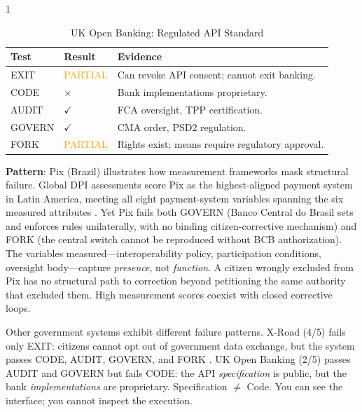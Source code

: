 \documentclass{article}
\begin{document}
\begin{table}[p]
    \begin{subtable}{1\textwidth}
        \centering
        \caption{UK Open Banking: Regulated API Standard}
        \begin{tabular}{@{}llp{7cm}@{}}
            \toprule
            \textbf{Test} & \textbf{Result} & \textbf{Evidence} \\
            \midrule
            EXIT & \textcolor{orange}{PARTIAL} & Can revoke API consent; cannot exit banking. \\
            CODE & $\times$ & Bank implementations proprietary. \\
            AUDIT & $\checkmark$ & FCA oversight, TPP certification. \\
            GOVERN & $\checkmark$ & CMA order, PSD2 regulation. \\
            FORK & \textcolor{orange}{PARTIAL} & Rights exist; means require regulatory approval. \\
            \bottomrule
        \end{tabular}
    \end{subtable}
\end{table}

\textbf{Pattern}: Pix (Brazil) illustrates how measurement frameworks mask structural failure. Global DPI assessments score Pix as the highest-aligned payment system in Latin America, meeting all eight payment-system variables spanning the six measured attributes \citep{ucl2025}. Yet Pix fails both GOVERN (Banco Central do Brasil sets and enforces rules unilaterally, with no binding citizen-corrective mechanism) and FORK (the central switch cannot be reproduced without BCB authorization). The variables measured---interoperability policy, participation conditions, oversight body---capture \textit{presence}, not \textit{function}. A citizen wrongly excluded from Pix has no structural path to correction beyond petitioning the same authority that excluded them. High measurement scores coexist with closed corrective loops.

Other government systems exhibit different failure patterns. X-Road (4/5) fails only EXIT: citizens cannot opt out of government data exchange, but the system passes CODE, AUDIT, GOVERN, and FORK \citep{xroad2026}. UK Open Banking (2/5) passes AUDIT and GOVERN but fails CODE: the API \textit{specification} is public, but the bank \textit{implementations} are proprietary. Specification $\neq$ Code. You can see the interface; you cannot inspect the execution.
\end{document}
